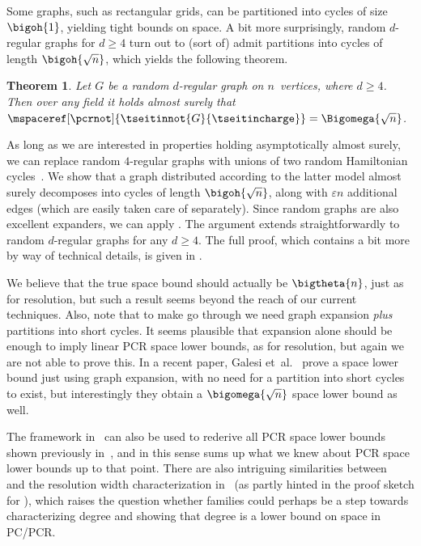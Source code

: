 \documentclass[11pt]{article}
\numberwithin{equation}{section}
\newtheorem{theorem}{Theorem}[section]
\theoremstyle{definition}
\theoremstyle{plain}
\providecommand{\etal}{et~al.}
\begin{document}
Some graphs, such as rectangular grids, can be partitioned into cycles
of size~$\bigoh{1}$, yielding tight bounds on space.
A bit more surprisingly, random \mbox{$d$-regular} graphs for $d \geq 4$ turn out to
(sort of)
admit partitions into cycles of %
length
$\bigoh{\sqrt{n}}$,
which yields the following theorem.

\begin{theorem}
  \label{thm:improved-general}
  Let $G$ be a random $d$-regular graph on $n$~vertices, where $d\geq 4$.
  Then over any field it holds almost surely that
  $\mspaceref[\pcrnot]{\tseitinnot{G}{\tseitincharge}} = \Bigomega{\sqrt{n}}$.
\end{theorem}

\begin{ourproof}[sketch]
  As long as we are interested in properties holding asymptotically
  almost surely, we can replace random $4$-regular graphs with unions
  of two random Hamiltonian cycles~\cite{KW}.
  We show that a graph distributed according to the latter
  model almost surely decomposes into cycles of length
  $\bigoh{\sqrt{n}}$, along with $\varepsilon n$ additional edges 
  (which are easily taken care of separately).
  Since random graphs are also excellent expanders, we can
  apply 
 .
  The argument  
  extends straightforwardly
  to random $d$-regular graphs for any 
  $d  \geq 4$.
  The full proof, which contains a bit more by way of technical
  details, is  given in
 .
\end{ourproof}

%
We 
%
believe that the true space bound should actually be
$\bigtheta{n}$, just as for resolution, but such a result seems beyond
the reach of 
our current techniques.
%
Also, note that to make
go through we need graph expansion
\emph{plus}
partitions into %
short cycles.
%
It seems 
%
plausible that expansion alone should 
be enough to imply
linear PCR space lower bounds, as for resolution, but again
we are not able to prove this.
In a recent paper, Galesi \etal~\cite{GKT19SpaceWidth}
  prove a space lower bound just using graph expansion, with no need
  for a partition into %
  short cycles to exist, but interestingly they
  obtain a $\bigomega{\sqrt{n}}$ space lower bound as well.


%
\label{sec:space-compl-funct}


The framework in~\cite{BG15Framework} can also be used to
rederive all PCR space lower bounds shown previously 
in~\cite{ABRW02SpaceComplexity,FLNRT15SpaceCplx}, and in this sense
\cite{BG15Framework} 
sums up what we knew about PCR space lower bounds up to that point.
There are also intriguing similarities between~%
\cite{BG15Framework} 
and the resolution width characterization 
  in~\cite{AD08CombinatoricalCharacterization}
(as partly hinted in the proof sketch for
),
which raises the question whether
\kextendibleNok families 
could perhaps be a step towards
characterizing degree and showing that degree
%
%
is a lower bound on  %
%
%
space in PC/PCR.
\end{document}
